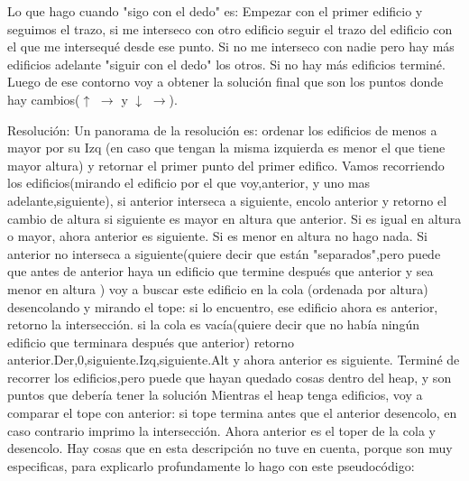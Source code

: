 \documentclass{article}
\begin{document}
Lo que hago cuando "sigo con el dedo" es: \newline
Empezar con el primer edificio y seguimos el trazo, si me interseco con otro edificio seguir el trazo del edificio con el que me intersequ\'e desde ese punto. \newline
Si no me interseco con nadie pero hay m\'as edificios adelante "siguir con el dedo" los otros. Si no hay más edificios termin\'e.\newline
Luego de ese contorno voy a obtener la soluci\'on final que son los puntos donde hay cambios($\uparrow$ $\longrightarrow$ y $\downarrow$ $\longrightarrow$). \newline

\newpage

{\noindent \Huge Resoluci\'on:}
\newline \newline
Un panorama de la resolución es:\newline
ordenar los edificios de menos a mayor por su Izq (en caso que tengan la misma izquierda es menor el que tiene mayor altura) y retornar el primer punto del primer edifico. \newline
Vamos recorriendo los edificios(mirando el edificio por el que voy,anterior, y uno mas adelante,siguiente), si anterior interseca a siguiente, encolo anterior y retorno el cambio de altura si siguiente es mayor en altura que anterior.\newline
Si es igual en altura o mayor, ahora anterior es siguiente. Si es menor en altura no hago nada. \color{red}{no vale la pena ponerlo} \newline \color{black}{}
Si anterior no interseca a siguiente(quiere decir que están "separados",pero puede que antes de anterior haya un edificio que termine después que anterior y sea menor en altura )
voy a buscar este edificio en la cola (ordenada por altura) desencolando y mirando el tope:\newline
si lo encuentro, ese edificio ahora es anterior, retorno la intersección.\newline
si la cola es vacía(quiere decir que no había ningún edificio que terminara después que anterior) retorno anterior.Der,0,siguiente.Izq,siguiente.Alt y ahora anterior es siguiente.
\newline
Terminé de recorrer los edificios,pero puede que hayan quedado cosas dentro del heap, y son puntos que debería tener la solución
Mientras el heap tenga edificios, voy a comparar el tope con anterior:\newline
si tope termina antes que el anterior desencolo, en caso contrario imprimo la intersección. 
Ahora anterior es el toper de la cola y desencolo.
\newline
Hay cosas que en esta descripción no tuve en cuenta, porque son muy especificas, para explicarlo profundamente lo hago con este pseudocódigo: 
\newline
 
\end{document}
